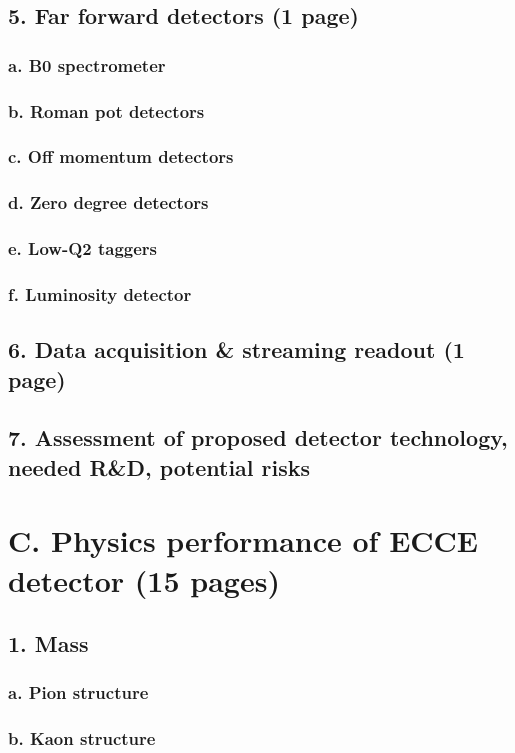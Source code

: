 \documentclass{report}
\begin{document}
\subsection{5. Far forward detectors (1 page)}
\subsubsection{a. B0 spectrometer}
\subsubsection{b. Roman pot detectors}
\subsubsection{c. Off momentum detectors}
\subsubsection{d. Zero degree detectors}
\subsubsection{e. Low-Q2 taggers}
\subsubsection{f. Luminosity detector}
\subsection{6. Data acquisition & streaming readout (1 page)}
\subsection{7. Assessment of proposed detector technology, needed R&D, potential risks}
%
\section{C. Physics performance of ECCE detector (15 pages)}
\subsection{1. Mass}
\subsubsection{a. Pion structure}
\subsubsection{b. Kaon structure}
\end{document}
